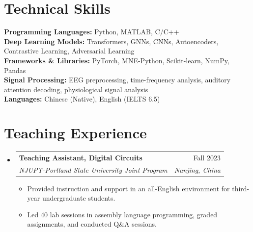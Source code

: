 \documentclass[letterpaper,10pt]{article}
\makeatletter
\newcommand{\resumeItem}[1]{\item\small{#1 \vspace{-2pt}}}
\newcommand{\resumeSubheading}[4]{
	\vspace{-2pt}\item
	\begin{tabular*}{0.97\textwidth}[t]{l@{\extracolsep{\fill}}r}
		\textbf{#1} & #2 \\
		\textit{\small#3} & \textit{\small #4} \\
	\end{tabular*}\vspace{-2pt}
}
\newcommand{\resumeSubHeadingListStart}{\begin{itemize}[leftmargin=0.15in, label={}]}
\newcommand{\resumeSubHeadingListEnd}{\end{itemize}}
\newcommand{\resumeItemListStart}{\begin{itemize}[leftmargin=0.20in]}
\newcommand{\resumeItemListEnd}{\end{itemize}\vspace{-1pt}}
\makeatother
\begin{document}
	\section{Technical Skills}
	\begin{itemize}[leftmargin=0.15in, label={}]
		\small{\item{
				\textbf{Programming Languages:} Python, MATLAB, C/C++ \\
				\textbf{Deep Learning Models:} Transformers, GNNs, CNNs, Autoencoders, Contrastive Learning, Adversarial Learning \\
				\textbf{Frameworks \& Libraries:} PyTorch, MNE-Python, Scikit-learn, NumPy, Pandas \\
				\textbf{Signal Processing:} EEG preprocessing, time-frequency analysis, auditory attention decoding, physiological signal analysis \\
				\textbf{Languages:} Chinese (Native), English (IELTS 6.5)
		}}
	\end{itemize}
	
	\section{Teaching Experience}
	\resumeSubHeadingListStart
	\resumeSubheading
	{Teaching Assistant, Digital Circuits}{Fall 2023}
	{NJUPT-Portland State University Joint Program}{Nanjing, China}
	\resumeItemListStart
	\resumeItem{Provided instruction and support in an all-English environment for third-year undergraduate students.}
	\resumeItem{Led 40 lab sessions in assembly language programming, graded assignments, and conducted Q\&A sessions.}
	\resumeItemListEnd
	\resumeSubHeadingListEnd

\end{document}
